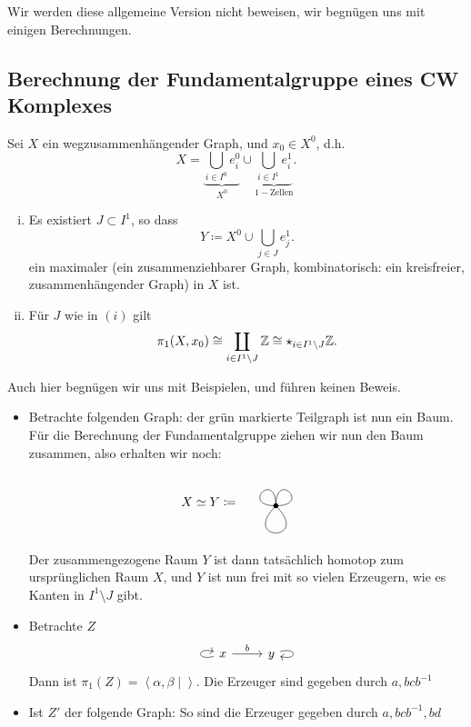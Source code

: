 Wir werden diese allgemeine Version nicht beweisen, wir begnügen uns mit einigen Berechnungen.

\subsection{Berechnung der Fundamentalgruppe eines CW Komplexes}

\begin{theorem}[Graphen]\label{thm:fundamentalgruppe-von-graphen}
    Sei $X$ ein wegzusammenhängender Graph, und  $x_0\in X^0$, d.h.
    \[
    X = \underbrace{\bigcup_{i \in  I^0} e_i^0 }_{X^0} \cup \underbrace{\bigcup_{i \in  I^1} e_i^1
}_{1-\text{Zellen}} 
    .\]
    \begin{enumerate}[(i)]
        \item Es existiert $J\subset I^1$, so dass
            \[
            Y \coloneqq  X^0 \cup \bigcup_{j\in J} e_j^1
            .\] 
            ein maximaler  (ein zusammenziehbarer Graph, kombinatorisch: ein kreisfreier, zusammenhängender Graph) in $X$ ist. 
        \item Für $J$ wie in  $(i)$ gilt
             \[
                 \pi_1(X,x_0) \cong \coprod_{i\in I^1 \setminus J} \mathbb{Z} \cong \star_{i\in I^1 \setminus J} \mathbb{Z}
            .\] 
    \end{enumerate}
\end{theorem}

\begin{oral}
    Auch hier begnügen wir uns mit Beispielen, und führen keinen Beweis.
\end{oral}

\begin{example}
    \begin{itemize}
        \item 
    Betrachte folgenden Graph:
    der grün markierte Teilgraph ist nun ein Baum. Für die Berechnung der Fundamentalgruppe ziehen wir nun den Baum zusammen, also erhalten wir noch:
    \[
       X \simeq Y \coloneqq 
       \begin{tikzpicture}[baseline = -0.2]
        \fill (0,0) circle (2pt);
        \draw (0,0) .. controls (1,0) and (0,1) .. (0,0);
        \draw (0,0) .. controls (0,1) and (-1,0) .. (0,0);
        \draw (0,0) .. controls (-1,-1) and (1,-1) .. (0,0);
    \end{tikzpicture}
\]
Der zusammengezogene Raum $Y$ ist dann tatsächlich homotop zum ursprünglichen Raum $X$, und  $Y$ ist nun frei mit so vielen Erzeugern, wie es Kanten in  $I^1 \setminus J$ gibt.
\item Betrachte  $Z$
    \[
    \begin{tikzcd}
        \arrow[loop left]{a} \ar{r}{b} x & y \ar[loop right]{c}
    \end{tikzcd}
\]
Dann ist $\pi_1(Z) = \left< α,β \mid  \right> $. Die Erzeuger sind gegeben durch $a, bcb^{-1}$
\item Ist $Z'$ der folgende Graph:
    So sind die Erzeuger gegeben durch $a,bc b^{-1}, bd$
    \end{itemize}
\end{example}
